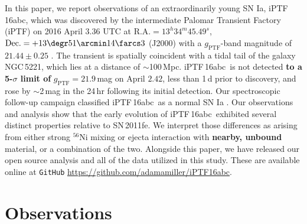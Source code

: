 \documentclass[twocolumn]{aastex61}
\newcommand{\abc}{iPTF\,16abc}
\begin{document}
In this paper, we report observations of an extraordinarily young SN Ia, \abc,
which was discovered by the intermediate Palomar Transient Factory (iPTF) on
2016 April $3.36$ UTC at $\textrm{R.A.}=13^h34^m45.49^s$,
$\textrm{Dec.}=+13\degr51\arcmin14\farcs3$ (J2000) with a
$g_\mathrm{PTF}$-band magnitude of $21.44\pm0.25$ \citep{2016ATel.8907....1M}.
The transient is spatially coincident with a tidal tail of the galaxy
NGC\,5221, which lies at a distance of $\sim$100\,Mpc. \abc\ is not detected
\textbf{to a 5-$\sigma$ limit of} $g_\mathrm{PTF}=21.9$\,mag on April $2.42$,
less than 1\,d prior to discovery, and rose by $\sim$2\,mag in the 24\,hr
following its initial detection. Our spectroscopic follow-up campaign
classified \abc\ as a normal SN Ia \citep{2016ATel.8909....1C}. Our
observations and analysis show that the early evolution of \abc\ exhibited
several distinct properties relative to SN\,2011fe. We interpret those
differences as arising from either strong $^{56}$Ni mixing or ejecta
interaction with \textbf{nearby, unbound} material, or a combination of the
two. Alongside this paper, we have released our open source analysis and all
of the data utilized in this study. These are available online at
\texttt{GitHub} \url{https://github.com/adamamiller/iPTF16abc}.



\section{Observations}
\label{sec:obs}
\end{document}
